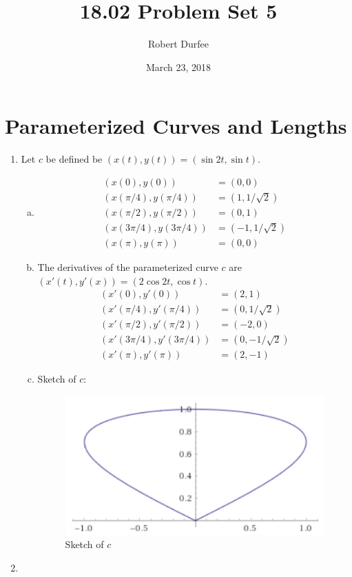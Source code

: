 \documentclass{article}
\title{ 18.02 Problem Set 5 }
\author{ Robert Durfee }
\date{ March 23, 2018 }
\begin{document}
\maketitle

\section{ Parameterized Curves and Lengths }

\begin{enumerate}[1.]
  \item Let $c$ be defined be $(x(t),y(t)) = (\sin 2t, \sin t)$.
    \begin{enumerate}[a.]
      \item \begin{align*}
          (x(0),y(0)) &= (0,0) \\
          (x(\pi / 4), y(\pi / 4)) &= (1, 1/\sqrt{2}) \\
          (x(\pi / 2), y(\pi / 2)) &= (0,1) \\
          (x(3 \pi / 4), y(3 \pi / 4)) &= (-1, 1/\sqrt{2}) \\
          (x(\pi), y(\pi)) &= (0, 0)
        \end{align*}
      \item The derivatives of the parameterized curve $c$ are $(x'(t), y'(x)) =
        (2\cos2t, \cos t)$.
        \begin{align*}
          (x'(0),y'(0)) &= (2,1) \\
          (x'(\pi / 4), y'(\pi / 4)) &= (0, 1/\sqrt{2}) \\
          (x'(\pi / 2), y'(\pi / 2)) &= (-2,0) \\
          (x'(3 \pi / 4), y'(3 \pi / 4)) &= (0, -1/\sqrt{2}) \\
          (x'(\pi), y'(\pi)) &= (2, -1)
        \end{align*}
      \item Sketch of $c$:

        \begin{figure}[H]
          \centering
          \includegraphics[scale=0.60]{"SketchOfC"}
          \caption{Sketch of $c$}
        \end{figure}
    \end{enumerate}
  \item
\end{enumerate}
\end{document}

